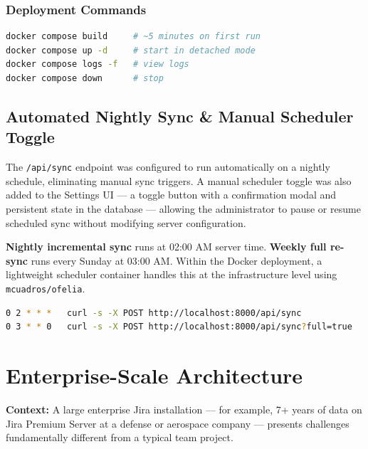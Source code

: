 \documentclass[12pt, a4paper]{article}
\begin{document}
\subsubsection{Deployment Commands}

\begin{lstlisting}[language=bash, caption={Production deployment workflow}]
docker compose build     # ~5 minutes on first run
docker compose up -d     # start in detached mode
docker compose logs -f   # view logs
docker compose down      # stop
\end{lstlisting}


\subsection{Automated Nightly Sync \& Manual Scheduler Toggle}

The \texttt{/api/sync} endpoint was configured to run automatically on a nightly schedule, eliminating manual sync triggers. A manual scheduler toggle was also added to the Settings UI — a toggle button with a confirmation modal and persistent state in the database — allowing the administrator to pause or resume scheduled sync without modifying server configuration.

\textbf{Nightly incremental sync} runs at 02:00 AM server time. \textbf{Weekly full re-sync} runs every Sunday at 03:00 AM. Within the Docker deployment, a lightweight scheduler container handles this at the infrastructure level using \texttt{mcuadros/ofelia}.

\begin{lstlisting}[language=bash, caption={Linux cron entries}]
0 2 * * *   curl -s -X POST http://localhost:8000/api/sync
0 3 * * 0   curl -s -X POST http://localhost:8000/api/sync?full=true
\end{lstlisting}


\section{Enterprise-Scale Architecture}

\begin{infobox}
\textbf{Context:} A large enterprise Jira installation — for example, 7+ years of data on Jira Premium Server at a defense or aerospace company — presents challenges fundamentally different from a typical team project.
\end{infobox}
\end{document}
